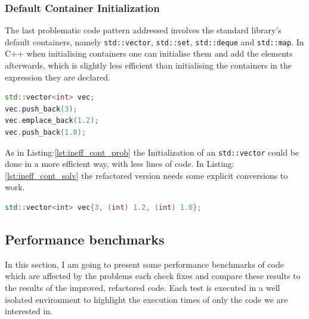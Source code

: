 \subsubsection{Default Container Initialization}
\par The last problematic code pattern addressed involves the standard library's default containers, namely \verb|std::vector|, \verb|std::set|, \verb|std::deque| and \verb|std::map|. In C++ when initialising containers one can initialise them and add the elements afterwards, which is slightly less efficient than initialising the containers in the expression they are declared. \medskip
\begin{lstlisting}[language=c++, frame=single ,caption={Inefficient way of creating containers}, label={lst:ineff_cont_prob}]
std::vector<int> vec;
vec.push_back(3);
vec.emplace_back(1.2);
vec.push_back(1.0);
\end{lstlisting}
\par As in Listing:\ref{lst:ineff_cont_prob} the Initialization of an \verb|std::vector| could be done in a more efficient way, with less lines of code. In Listing:\ref{lst:ineff_cont_solv}  the refactored version needs some explicit conversions to work. 
\begin{lstlisting}[language=c++, frame=single ,caption={A faster way of initialising}, label={lst:ineff_cont_solv}]
std::vector<int> vec{3, (int) 1.2, (int) 1.0};
\end{lstlisting}
\subsection{Performance benchmarks}
\par In this section, I am going to present some performance benchmarks of code which are affected by the problems each check fixes and compare these results to the results of the improved, refactored code. Each test is executed in a well isolated environment to highlight the execution times of only the code we are interested in. 
